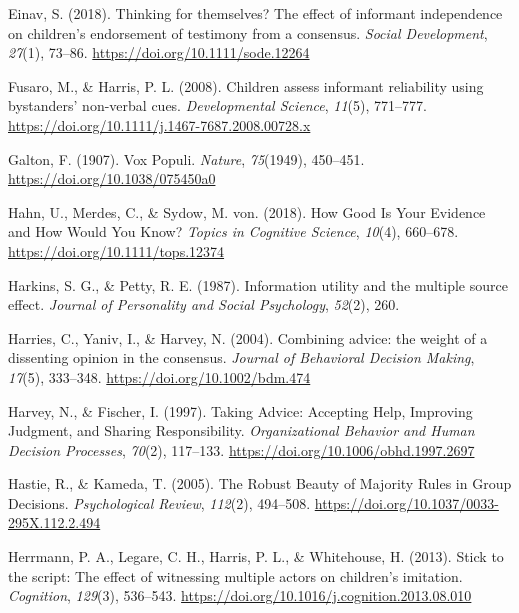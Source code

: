 \documentclass[
  doc,floatsintext]{apa6}
\newlength{\cslhangindent}
\newenvironment{CSLReferences}[2] %
 {\begin{list}{}{%
  \setlength{\itemindent}{0pt}
  \setlength{\leftmargin}{0pt}
  \setlength{\parsep}{0pt}
  \ifodd #1
   \setlength{\leftmargin}{\cslhangindent}
   \setlength{\itemindent}{-1\cslhangindent}
  \fi
  \setlength{\itemsep}{#2\baselineskip}}}
 {\end{list}}
\begin{document}
\begin{CSLReferences}{1}{0}
Einav, S. (2018). Thinking for themselves? The effect of informant independence on children's endorsement of testimony from a consensus. \emph{Social Development}, \emph{27}(1), 73--86. \url{https://doi.org/10.1111/sode.12264}

Fusaro, M., \& Harris, P. L. (2008). Children assess informant reliability using bystanders{'} non-verbal cues. \emph{Developmental Science}, \emph{11}(5), 771--777. \url{https://doi.org/10.1111/j.1467-7687.2008.00728.x}

Galton, F. (1907). Vox Populi. \emph{Nature}, \emph{75}(1949), 450--451. \url{https://doi.org/10.1038/075450a0}

Hahn, U., Merdes, C., \& Sydow, M. von. (2018). How Good Is Your Evidence and How Would You Know? \emph{Topics in Cognitive Science}, \emph{10}(4), 660--678. \url{https://doi.org/10.1111/tops.12374}

Harkins, S. G., \& Petty, R. E. (1987). Information utility and the multiple source effect. \emph{Journal of Personality and Social Psychology}, \emph{52}(2), 260.

Harries, C., Yaniv, I., \& Harvey, N. (2004). Combining advice: the weight of a dissenting opinion in the consensus. \emph{Journal of Behavioral Decision Making}, \emph{17}(5), 333--348. \url{https://doi.org/10.1002/bdm.474}

Harvey, N., \& Fischer, I. (1997). Taking Advice: Accepting Help, Improving Judgment, and Sharing Responsibility. \emph{Organizational Behavior and Human Decision Processes}, \emph{70}(2), 117--133. \url{https://doi.org/10.1006/obhd.1997.2697}

Hastie, R., \& Kameda, T. (2005). The Robust Beauty of Majority Rules in Group Decisions. \emph{Psychological Review}, \emph{112}(2), 494--508. \url{https://doi.org/10.1037/0033-295X.112.2.494}

Herrmann, P. A., Legare, C. H., Harris, P. L., \& Whitehouse, H. (2013). Stick to the script: The effect of witnessing multiple actors on children{'}s imitation. \emph{Cognition}, \emph{129}(3), 536--543. \url{https://doi.org/10.1016/j.cognition.2013.08.010}


\end{CSLReferences}
\end{document}

